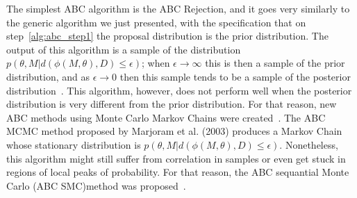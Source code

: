 The simplest ABC algorithm is the ABC Rejection, and it goes very 
similarly to the generic algorithm we just presented, with the 
specification that on step~\ref{alg:abc_step1} the proposal distribution
is the prior distribution. The output of this algorithm is a sample of 
the distribution $p (\theta, M| d (\phi (M, \theta), D) \leq \epsilon)$; 
when $\epsilon \to \infty$ this is then a sample of the prior 
distribution, and as $\epsilon \to 0$ then this sample tends to be a
sample of the posterior distribution~\cite{Pritchard1999}. This 
algorithm, however, does not perform well when the posterior 
distribution is very different from the prior distribution. For that 
reason, new ABC methods using Monte Carlo Markov Chains were 
created~\cite{Marjoram2003}. The ABC MCMC method proposed by Marjoram et 
al. (2003) produces a Markov Chain whose stationary distribution is
$p (\theta, M | d (\phi (M, \theta), D) \leq \epsilon)$. Nonetheless, 
this algorithm might still suffer from correlation in samples or even
get stuck in regions of local peaks of probability. For that reason,
the ABC sequantial Monte Carlo (ABC SMC)method was 
proposed~\cite{Toni2009}.

